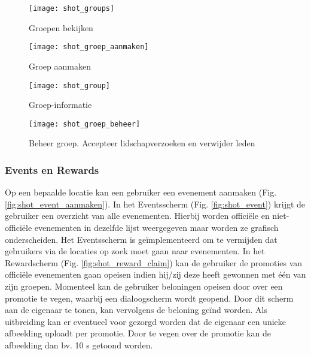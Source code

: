 \begin{figure}[ht]

\begin{minipage}[b]{0.25\linewidth}
\centering
\texttt{[image: shot\_groups]}
\caption{Groepen bekijken}
\label{fig:shot_groups}
\end{minipage}
\hspace{1cm}
\begin{minipage}[b]{0.25\linewidth}
\centering
\texttt{[image: shot\_groep\_aanmaken]}
\caption{Groep aanmaken}
\label{fig:shot_groep_aanmaken}
\end{minipage}
\hspace{1cm}
\begin{minipage}[b]{0.25\linewidth}
\centering
\texttt{[image: shot\_group]}
\caption{Groep-informatie}
\label{fig:shot_group}
\end{minipage}

\end{figure}

\begin{figure}[ht]
\centering
\begin{minipage}[b]{0.5\linewidth}
\centering
\texttt{[image: shot\_groep\_beheer]}
\caption{Beheer groep. Accepteer lidschapverzoeken en verwijder leden}
\label{fig:shot_groep_beheer}
\end{minipage}


\end{figure}

\clearpage

\subsubsection{Events en Rewards}%
Op een bepaalde locatie kan een gebruiker een evenement aanmaken (Fig. \ref{fig:shot_event_aanmaken}).
In het Eventsscherm (Fig. \ref{fig:shot_event}) krijgt de gebruiker een overzicht van alle evenementen. Hierbij worden officiële en niet-officiële evenementen in dezelfde lijst weergegeven maar worden ze grafisch onderscheiden. Het Eventsscherm is geïmplementeerd om te vermijden dat gebruikers via de locaties op zoek moet gaan naar evenementen.
In het Rewardscherm (Fig. \ref{fig:shot_reward_claim}) kan de gebruiker de promoties van officiële evenementen gaan opeisen indien hij/zij deze heeft gewonnen met één van zijn groepen. Momenteel kan de gebruiker beloningen opeisen door over een promotie te vegen, waarbij een dialoogscherm wordt geopend. Door dit scherm aan de eigenaar te tonen, kan vervolgens de beloning geïnd worden. Als uitbreiding kan er eventueel voor gezorgd worden dat de eigenaar een unieke afbeelding uploadt per promotie. Door te vegen over de promotie kan de afbeelding dan bv. 10 s getoond worden.

